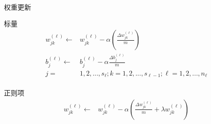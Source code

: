 \begin{frame}{权重更新}

\begin{block}{标量}
\[\begin{aligned}
  w_{jk}^{(\ell )} \leftarrow  & w_{jk}^{(\ell )} - \alpha \left( {\frac{{\Delta w_{jk}^{(\ell )}}}{m}} \right) \\ 
  b_j^{(\ell )} \leftarrow  & b_j^{(\ell )} - \alpha \frac{{\Delta b_j^{(\ell )}}}{m} \\ 
  j =  & 1,2,...,{s_\ell }; k = 1,2,...,{s_{\ell  - 1}}; \ell  =  1,2,...,{n_\ell } \\ 
\end{aligned} \]
\end{block}

\begin{block}{正则项}
\[\begin{aligned}
  w_{jk}^{(\ell )} \leftarrow  & w_{jk}^{(\ell )} - \alpha \left( {\frac{{\Delta w_{jk}^{(\ell )}}}{m} + \lambda w_{jk}^{(\ell )}} \right) \\
\end{aligned} \]
\end{block}


\end{frame}
